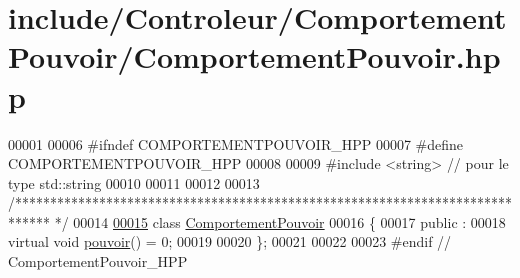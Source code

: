 \hypertarget{_comportement_pouvoir_8hpp_source}{\section{include/\-Controleur/\-Comportement\-Pouvoir/\-Comportement\-Pouvoir.hpp}
}

\begin{DoxyCode}
00001 
00006 \textcolor{preprocessor}{#ifndef COMPORTEMENTPOUVOIR\_HPP}
00007 \textcolor{preprocessor}{}\textcolor{preprocessor}{#define COMPORTEMENTPOUVOIR\_HPP}
00008 \textcolor{preprocessor}{}
00009 \textcolor{preprocessor}{#include <string>} \textcolor{comment}{// pour le type std::string}
00010 
00011 
00012 
00013 \textcolor{comment}{/*****************************************************************************
      */}
00014 
\hypertarget{_comportement_pouvoir_8hpp_source_l00015}{}\hyperlink{class_comportement_pouvoir}{00015} \textcolor{keyword}{class }\hyperlink{class_comportement_pouvoir}{ComportementPouvoir}
00016 \{
00017    \textcolor{keyword}{public} :
00018     \textcolor{keyword}{virtual} \textcolor{keywordtype}{void} \hyperlink{class_comportement_pouvoir_a8b8f4e753291ab73ab0016106f3948ff}{pouvoir}() = 0;
00019    
00020 \};
00021 
00022 
00023 \textcolor{preprocessor}{#endif // ComportementPouvoir\_HPP}
\end{DoxyCode}
